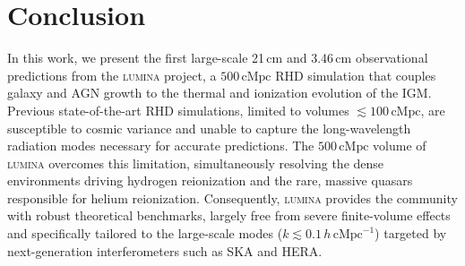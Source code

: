 \documentclass[apj,twocolumn, appendixfloats, twocolappendix, numberedappendix, tighten]{openjournal}
\DeclareRobustCommand{\lumina}{\mbox{\textsc{lumina}}\xspace}
\begin{document}

\section{Conclusion}
\label{sec:concl}

In this work, we present the first large-scale 21\,cm and 3.46\,cm observational predictions from the \lumina project, a $500\,\mathrm{cMpc}$ RHD simulation that couples galaxy and AGN growth to the thermal and ionization evolution of the IGM. Previous state-of-the-art RHD simulations, limited to volumes $\lesssim 100\,\mathrm{cMpc}$, are susceptible to cosmic variance and unable to capture the long-wavelength radiation modes necessary for accurate predictions. The $500\,\mathrm{cMpc}$ volume of \lumina overcomes this limitation, simultaneously resolving the dense environments driving hydrogen reionization and the rare, massive quasars responsible for helium reionization. Consequently, \lumina provides the community with robust theoretical benchmarks, largely free from severe finite-volume effects and specifically tailored to the large-scale modes ($k \lesssim 0.1\,h\,\mathrm{cMpc}^{-1}$) targeted by next-generation interferometers such as SKA and HERA.
\end{document}
